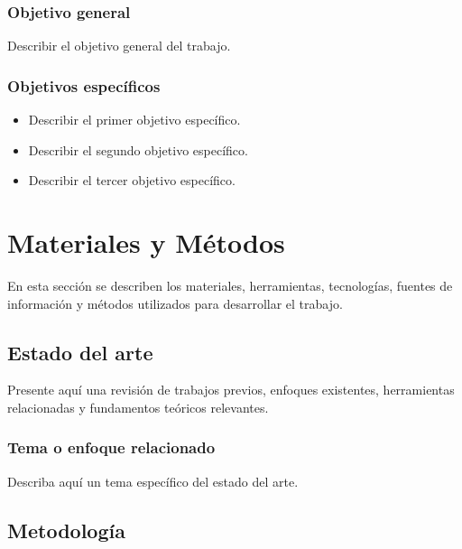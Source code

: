 \documentclass[12pt]{article}
\begin{document}
\subsubsection{Objetivo general}

Describir el objetivo general del trabajo.

\subsubsection{Objetivos específicos}

\begin{itemize}
    \item Describir el primer objetivo específico.
    \item Describir el segundo objetivo específico.
    \item Describir el tercer objetivo específico.
\end{itemize}

\newpage


\section{Materiales y Métodos}

En esta sección se describen los materiales, herramientas, tecnologías, fuentes de información y métodos utilizados para desarrollar el trabajo.

\subsection{Estado del arte}

Presente aquí una revisión de trabajos previos, enfoques existentes, herramientas relacionadas y fundamentos teóricos relevantes.

\subsubsection{Tema o enfoque relacionado}

Describa aquí un tema específico del estado del arte.

\subsection{Metodología}
\end{document}
